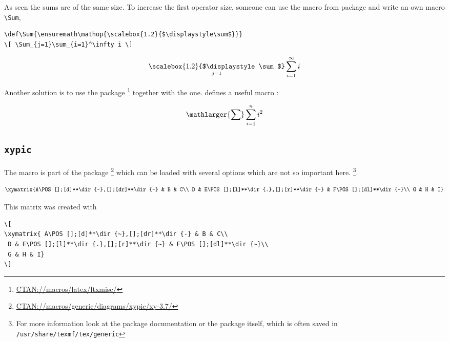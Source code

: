 \begin{table}[htb]
As seen the sums are of the same size. To increase the first operator size, someone
can use the  macro from package  and write an own macro    %
\verb+\Sum+, \eg {}

\begin{lstlisting}
\def\Sum{\ensuremath\mathop{\scalebox{1.2}{$\displaystyle\sum$}}}
\[ \Sum_{j=1}\sum_{i=1}^\infty i \]
\end{lstlisting}

\def\Sum{\ensuremath\mathop{\scalebox{1.2}{$\displaystyle\sum$}}}
\[ \Sum_{j=1}\sum_{i=1}^\infty i \]

Another solution is to use the  package%
\footnote{\href{http://www.ctan.org/tex-archive/macros/latex/ltxmisc/}{CTAN://macros/latex/ltxmisc/}} 
together with the  one.  defines a useful macro :

\begin{LTXexample}
\[ \mathlarger{\sum}\sum_{i=1}^n i^2 \]
\end{LTXexample}


\subsection{\texttt{xypic}}\label{xypic.sty}

The  macro is part of the  package%
\footnote{\href{http://www.ctan.org/tex-archive/support/latex2html/}%
{CTAN://macros/generic/diagrams/xypic/xy-3.7/}} which can be loaded with several options
which are not so important here.%
\footnote{For more information look at the package documentation or the
package  itself, which is often saved in \texttt{/usr/share/texmf/tex/generic}}.

\begin{equation}
\xymatrix{A\POS[];[d]**\dir{~},[];[dr]**\dir{-} & B & C\\
D & E\POS[];[l]**\dir{.},[];[r]**\dir{~} & F\POS[];[dl]**\dir{~}\\
G & H & I}
\label{eq:xymatrix}
\end{equation}


This matrix was created with

\begin{lstlisting}
\[
\xymatrix{ A\POS [];[d]**\dir {~},[];[dr]**\dir {-} & B & C\\
 D & E\POS [];[l]**\dir {.},[];[r]**\dir {~} & F\POS [];[dl]**\dir {~}\\
 G & H & I}
\]
\end{lstlisting}





\end{table}
